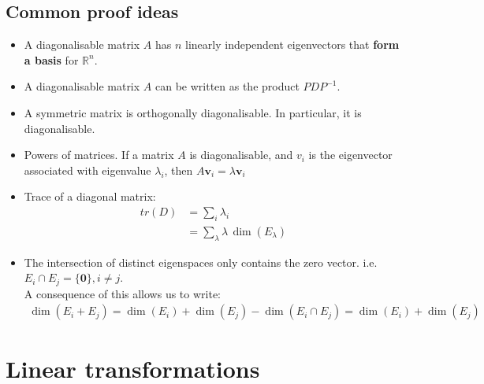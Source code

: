 \documentclass{article}
\begin{document}
\subsection{Common proof ideas}
\begin{itemize}
	\item A diagonalisable matrix $A$ has $n$ linearly independent eigenvectors that \textbf{form a basis} for $\mathbb{R}^n$.
	\item A diagonalisable matrix $A$ can be written as the product $PDP^{-1}$.
	\item A symmetric matrix is orthogonally diagonalisable. In particular, it is diagonalisable.
	\item Powers of matrices. If a matrix $A$ is diagonalisable, and $v_i$ is the eigenvector associated with eigenvalue $\lambda_i$, then $A\mathbf{v}_i=\lambda \mathbf{v}_i$
	\item Trace of a diagonal matrix:
	\begin{align*}
		tr(D) &= \sum_i\lambda_i\\
		&= \sum_{\lambda}\lambda\, \dim(E_\lambda)
	\end{align*}
	\item The intersection of distinct eigenspaces only contains the zero vector. i.e. $E_i\cap E_j=\{\mathbf{0}\},i\neq j$.\\
	A consequence of this allows us to write:
	\begin{align*}
		\dim(E_i + E_j)=\dim(E_i)+\dim(E_j)-\dim(E_i\cap E_j)=\dim(E_i)+\dim(E_j)
	\end{align*}
\end{itemize}	
	
\section{Linear transformations}
\end{document}
